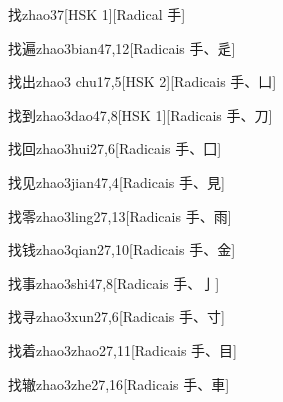 \begin{entry}{找}{zhao3}{7}[HSK 1][Radical ⼿]
\end{entry}

\begin{entry}{找遍}{zhao3bian4}{7,12}[Radicais ⼿、⾡]
\end{entry}

\begin{entry}{找出}{zhao3 chu1}{7,5}[HSK 2][Radicais ⼿、⼐]
\end{entry}

\begin{entry}{找到}{zhao3dao4}{7,8}[HSK 1][Radicais ⼿、⼑]
\end{entry}

\begin{entry}{找回}{zhao3hui2}{7,6}[Radicais ⼿、⼞]
\end{entry}

\begin{entry}{找见}{zhao3jian4}{7,4}[Radicais ⼿、⾒]
\end{entry}

\begin{entry}{找零}{zhao3ling2}{7,13}[Radicais ⼿、⾬]
\end{entry}

\begin{entry}{找钱}{zhao3qian2}{7,10}[Radicais ⼿、⾦]
\end{entry}

\begin{entry}{找事}{zhao3shi4}{7,8}[Radicais ⼿、⼅]
\end{entry}

\begin{entry}{找寻}{zhao3xun2}{7,6}[Radicais ⼿、⼨]
\end{entry}

\begin{entry}{找着}{zhao3zhao2}{7,11}[Radicais ⼿、⽬]
\end{entry}

\begin{entry}{找辙}{zhao3zhe2}{7,16}[Radicais ⼿、⾞]
\end{entry}

